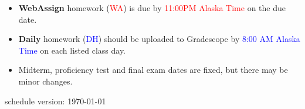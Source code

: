 \documentclass[12pt]{article}
\begin{document}
\begin{itemize}
\item \textbf{WebAssign} homework (\textcolor{red}{WA}) is due by \textcolor{red}{11:00PM Alaska Time} on the due date.
\item \textbf{Daily} homework (\textcolor{blue}{DH}) should be uploaded to Gradescope by \textcolor{blue}{8:00 AM Alaska Time} on each listed class day.
\item Midterm, proficiency test and final exam dates are fixed, but there may be minor changes.
\end{itemize}



\vfill
\hfill \scriptsize schedule version: \today \normalsize
\end{document}
